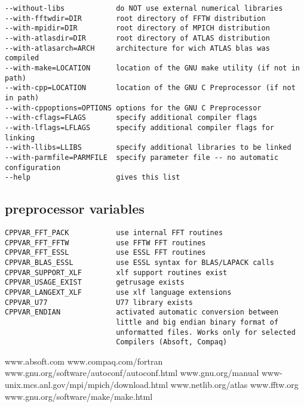 \documentclass[a4paper,10pt]{article}
\begin{document}
\begin{verbatim}
--without-libs            do NOT use external numerical libraries
--with-fftwdir=DIR        root directory of FFTW distribution
--with-mpidir=DIR         root directory of MPICH distribution
--with-atlasdir=DIR       root directory of ATLAS distribution
--with-atlasarch=ARCH     architecture for wich ATLAS blas was compiled 
--with-make=LOCATION      location of the GNU make utility (if not in path)
--with-cpp=LOCATION       location of the GNU C Preprocessor (if not in path)
--with-cppoptions=OPTIONS options for the GNU C Preprocessor
--with-cflags=FLAGS       specify additional compiler flags
--with-lflags=LFLAGS      specify additional compiler flags for linking
--with-llibs=LLIBS        specify additional libraries to be linked
--with-parmfile=PARMFILE  specify parameter file -- no automatic configuration
--help                    gives this list
\end{verbatim}

\subsection*{preprocessor variables}

\begin{verbatim}
CPPVAR_FFT_PACK           use internal FFT routines
CPPVAR_FFT_FFTW           use FFTW FFT routines
CPPVAR_FFT_ESSL           use ESSL FFT routines
CPPVAR_BLAS_ESSL          use ESSL syntax for BLAS/LAPACK calls 
CPPVAR_SUPPORT_XLF        xlf support routines exist 
CPPVAR_USAGE_EXIST        getrusage exists
CPPVAR_LANGEXT_XLF        use xlf language extensions
CPPVAR_U77                U77 library exists
CPPVAR_ENDIAN             activated automatic conversion between 
                          little and big endian binary format of 
                          unformatted files. Works only for selected
                          Compilers (Absoft, Compaq)
\end{verbatim}


\begin{thebibliography}{99}
 www.absoft.com
 www.compaq.com/fortran
 www.gnu.org/software/autoconf/autoconf.html
 www.gnu.org/manual
 www-unix.mcs.anl.gov/mpi/mpich/download.html
 www.netlib.org/atlas
 www.fftw.org
 www.gnu.org/software/make/make.html
\end{thebibliography}
\end{document}
